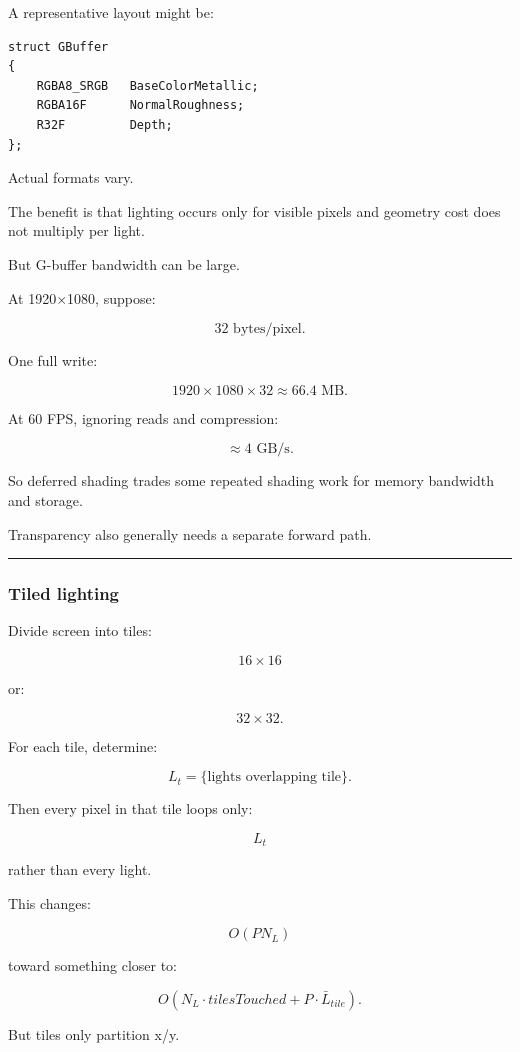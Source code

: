 A representative layout might be:

\begin{verbatim}
struct GBuffer
{
    RGBA8_SRGB   BaseColorMetallic;
    RGBA16F      NormalRoughness;
    R32F         Depth;
};
\end{verbatim}

Actual formats vary.

The benefit is that lighting occurs only for visible pixels and geometry cost does not multiply per light.

But G-buffer bandwidth can be large.

At 1920×1080, suppose:

\[
32\text{ bytes/pixel}.
\]

One full write:

\[
1920\times1080\times32
\approx66.4\text{ MB}.
\]

At 60 FPS, ignoring reads and compression:

\[
\approx4\text{ GB/s}.
\]

So deferred shading trades some repeated shading work for memory bandwidth and storage.

Transparency also generally needs a separate forward path.

\begin{center}\rule{0.5\linewidth}{0.5pt}\end{center}

\subsubsection{Tiled lighting}\label{tiled-lighting}

Divide screen into tiles:

\[
16\times16
\]

or:

\[
32\times32.
\]

For each tile, determine:

\[
L_t=
\{\text{lights overlapping tile}\}.
\]

Then every pixel in that tile loops only:

\[
L_t
\]

rather than every light.

This changes:

\[
O(PN_L)
\]

toward something closer to:

\[
O(
N_L\cdot tilesTouched
+
P\cdot \bar L_{tile}
).
\]

But tiles only partition x/y.

